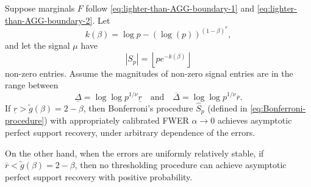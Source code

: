 \begin{theorem} \label{thm:lighter-than-AGG}
Suppose marginals $F$ follow \eqref{eq:lighter-than-AGG-boundary-1} and \eqref{eq:lighter-than-AGG-boundary-2}.
Let
$$
k(\beta) = \log{p} - \left(\log(p)\right)^{(1-\beta)^\nu},
$$
and let the signal $\mu$ have 
$$|S_p| = \left\lfloor pe^{-k(\beta)} \right\rfloor$$
non-zero entries. Assume the magnitudes of non-zero signal entries are in the range between
$$\underline{\Delta} = \log{\log{p}}^{1/\nu}\underline{r}
\quad\text{and}\quad
\overline{\Delta} = \log{\log{p}}^{1/\nu}\overline{r}.$$
If $\underline{r} > \widetilde{g}(\beta) = 2 - \beta$, then Bonferroni's procedure $\widehat{S}_p$ (defined in \eqref{eq:Bonferroni-procedure}) with appropriately calibrated FWER $\alpha\to 0$ achieves asymptotic perfect support recovery, under arbitrary dependence of the errors.

On the other hand, when the errors are uniformly relatively stable, if $\overline{r} < \widetilde{g}(\beta) = 2 - \beta$, then no thresholding procedure can achieve asymptotic perfect support recovery with positive probability.
\end{theorem}


